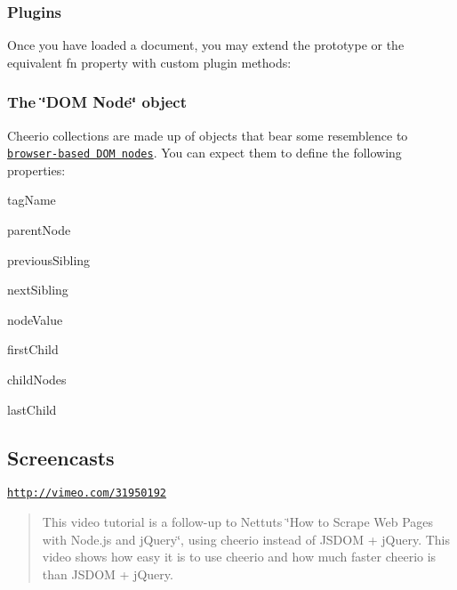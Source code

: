 \subsubsection*{Plugins}

Once you have loaded a document, you may extend the prototype or the equivalent {\ttfamily fn} property with custom plugin methods\+:




\subsubsection*{The \char`\"{}\+D\+O\+M Node\char`\"{} object}

Cheerio collections are made up of objects that bear some resemblence to \href{https://developer.mozilla.org/en-US/docs/Web/API/Node}{\tt browser-\/based D\+OM nodes}. You can expect them to define the following properties\+:


\begin{DoxyItemize}
\item {\ttfamily tag\+Name}
\item {\ttfamily parent\+Node}
\item {\ttfamily previous\+Sibling}
\item {\ttfamily next\+Sibling}
\item {\ttfamily node\+Value}
\item {\ttfamily first\+Child}
\item {\ttfamily child\+Nodes}
\item {\ttfamily last\+Child}
\end{DoxyItemize}

\subsection*{Screencasts}

\href{http://vimeo.com/31950192}{\tt http\+://vimeo.\+com/31950192}

\begin{quote}
This video tutorial is a follow-\/up to Nettut\textquotesingle{}s \char`\"{}\+How to Scrape Web Pages with Node.\+js and j\+Query\char`\"{}, using cheerio instead of J\+S\+D\+OM + j\+Query. This video shows how easy it is to use cheerio and how much faster cheerio is than J\+S\+D\+OM + j\+Query. \end{quote}


